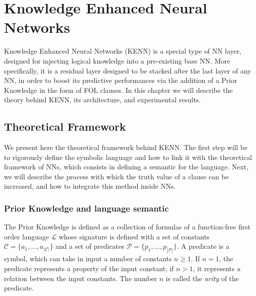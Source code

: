 
\chapter{Knowledge Enhanced Neural Networks}\label{chapt:kenn}
Knowledge Enhanced Neural Networks (KENN) \cite{daniele2019kenn} is a special type of NN layer, designed for injecting logical knowledge into a pre-existing base NN. More specifically, it is a residual layer designed to be stacked after the last layer of any NN, in order to boost its predictive performances via the addition of a Prior Knowledge in the form of FOL clauses. In this chapter we will describe the theory behind KENN, its architecture, and experimental results.

\section{Theoretical Framework}\label{sec:kenn_theoretical_framework}
 We present here the theoretical framework behind KENN. The first step will be to rigorously define the symbolic language and how to link it with the theoretical framework of NNs, which consists in defining a semantic for the language. Next, we will describe the process with which the truth value of a clause can be increased, and how to integrate this method inside NNs.
 
 \subsection{Prior Knowledge and language semantic}

\begin{definition}
	
	The Prior Knowledge is defined as a collection of formulas of a function-free first order language $\mathcal{L}$ whose signature is defined with a set of constants $\mathcal{C} = \{a_1, \dots, a_{|\mathcal{C}|}\}$ and a set of predicates $\mathcal{P} = \{p_1, \dots, p_{|\mathcal{P}|}\}$. 
	A predicate is a symbol, which can take in input a number of constants $n \geq 1$. If $n=1$, the predicate represents a property of the input constant; if $n>1$, it represents a relation between the input constants. The number $n$ is called the \textit{arity} of the predicate.
\end{definition}

